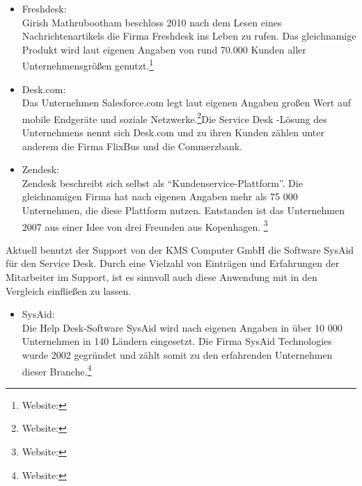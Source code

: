 \begin{itemize}
\item Freshdesk:\\
		Girish Mathrubootham beschloss 2010 nach dem Lesen eines Nachrichtenartikels die Firma 
		Freshdesk ins Leben zu rufen. Das gleichnamige Produkt wird laut eigenen Angaben von rund 
		70.000 Kunden aller Unternehmensgrößen genutzt.\footnote{Website:\cite{Freshdesk}}
		\\
		 
\item Desk.com:\\
		Das Unternehmen Salesforce.com legt laut eigenen Angaben großen Wert auf mobile 
		Endgeräte und soziale Netzwerke.\footnote{Website:\cite{Salesforce}}Die Service Desk -Lösung des 
		Unternehmens nennt sich 	Desk.com und zu ihren Kunden zählen unter anderem die Firma FlixBus und die 
		Commerzbank.
		\\
		
\item Zendesk:\\
		Zendesk beschreibt sich selbst als \enquote{Kundenservice-Plattform}. Die gleichnamigen 
		Firma hat nach eigenen Angaben mehr als 75 000 Unternehmen, die diese Plattform nutzen. 
		Entstanden ist das Unternehmen 2007 aus einer Idee von drei Freunden aus Kopenhagen.
		\footnote{Website:\cite{Zendesk}}
		\\		
\end{itemize}

\noindent
Aktuell benutzt der Support von der KMS Computer GmbH die Software SysAid für den Service Desk. Durch eine Vielzahl von Einträgen und Erfahrungen der Mitarbeiter im Support, ist es sinnvoll auch diese Anwendung mit in den Vergleich einfließen zu lassen.

\begin{itemize}
\item SysAid:\\
		 Die Help Desk-Software SysAid wird nach eigenen Angaben in über 10 000 Unternehmen in 
		 140 Ländern eingesetzt. Die Firma SysAid Technologies wurde 2002 gegründet und zählt somit 
		 zu den erfahrenden Unternehmen dieser Branche.\footnote{Website:\cite{SysAid}}
		\\
\end{itemize}	

